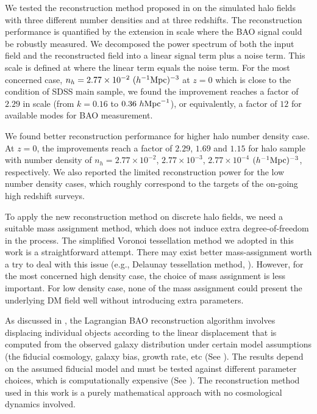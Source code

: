 \documentclass[iop]{emulateapj}
\newcommand{\mpch}{h^{-1} {\rm Mpc}}
\newcommand{\hmpc}{h {\rm Mpc}^{-1}}
\begin{document}
{We tested the reconstruction method proposed in \citet{zhuhm16c} on the simulated halo fields with three different number densities and at three redshifts.
The reconstruction performance is quantified by the extension in scale where the BAO signal could be robustly measured.
We decomposed the power spectrum of both the input field and the reconstructed field into a linear signal term plus a noise term.
This scale is defined at where the linear term equals the noise term.
For the most concerned case, $n_h=2.77\times 10^{-2}\ (\mpch)^{-3}$ at $z=0$ which is close to the condition of SDSS main sample, we found the improvement reaches a factor of $2.29$ in scale (from $k=0.16$ to $0.36\ \hmpc$), or equivalently, a factor of $12$ for available modes for BAO measurement.

We found better reconstruction performance for higher halo number density case.
At $z=0$, the improvements reach a factor of $2.29$, $1.69$ and $1.15$ for halo sample with number density of $n_h=2.77\times 10^{-2}$, $2.77\times 10^{-3}$, $2.77\times 10^{-4}$ $(\mpch)^{-3}$, respectively.
We also reported the limited reconstruction power for the low number density cases, which roughly correspond to the targets of the on-going high redshift surveys.

To apply the new reconstruction method on discrete halo fields,
we need a suitable mass assignment method, which does not induce extra degree-of-freedom in the process.
The simplified Voronoi tessellation method we adopted in this work is a straightforward attempt.
There may exist better mass-assignment worth a try to deal with this issue (e.g., Delaunay tessellation method, \cite{Cautun11}).
However, for the most concerned high density case, the choice of mass assignment is less important.
For low density case, none of the mass assignment could present the underlying DM field well without introducing extra parameters.

As discussed in \cite{zhuhm16c},
the Lagrangian BAO reconstruction algorithm involves displacing individual objects according to the linear displacement that is computed from the observed galaxy distribution under certain model assumptions (the fiducial cosmology, galaxy bias, growth rate, etc (See \cite{Eisenstein07}). The results depend on the assumed fiducial model and must be tested against different parameter choices, which is computationally expensive (See \cite{Padmanabhan12}). The reconstruction method used in this work is a purely mathematical approach with no cosmological dynamics involved. 

}
\end{document}
